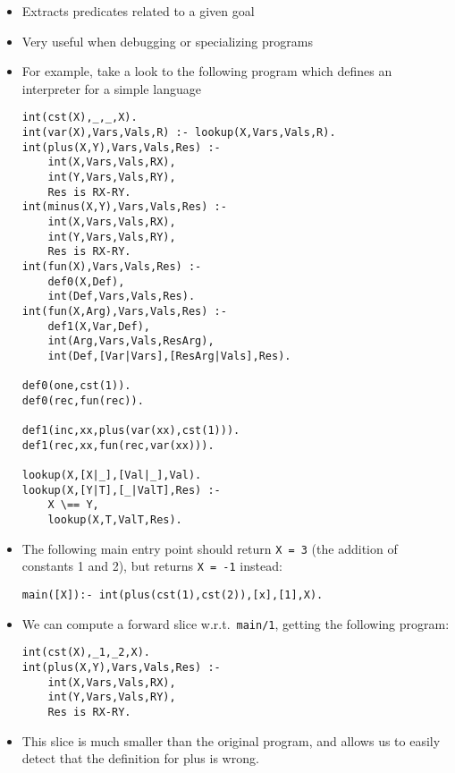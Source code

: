 \documentclass{article}
\renewcommand{\_}{\char'137}
\begin{document}
\begin{itemize}
\item Extracts predicates related to a given goal
\item Very useful when debugging or specializing programs
\item For example, take a look to the following program which defines
  an interpreter for a simple language

\begin{verbatim}
int(cst(X),_,_,X).
int(var(X),Vars,Vals,R) :- lookup(X,Vars,Vals,R).
int(plus(X,Y),Vars,Vals,Res) :- 
    int(X,Vars,Vals,RX), 
    int(Y,Vars,Vals,RY), 
    Res is RX-RY.
int(minus(X,Y),Vars,Vals,Res) :- 
    int(X,Vars,Vals,RX), 
    int(Y,Vars,Vals,RY), 
    Res is RX-RY.
int(fun(X),Vars,Vals,Res) :- 
    def0(X,Def), 
    int(Def,Vars,Vals,Res).
int(fun(X,Arg),Vars,Vals,Res) :- 
    def1(X,Var,Def), 
    int(Arg,Vars,Vals,ResArg),
    int(Def,[Var|Vars],[ResArg|Vals],Res).

def0(one,cst(1)).
def0(rec,fun(rec)).

def1(inc,xx,plus(var(xx),cst(1))).
def1(rec,xx,fun(rec,var(xx))).

lookup(X,[X|_],[Val|_],Val).
lookup(X,[Y|T],[_|ValT],Res) :-
    X \== Y, 
    lookup(X,T,ValT,Res).
\end{verbatim}
  
\item The following main entry point should return \verb+X = 3+ (the
  addition of constants 1 and 2), but returns \verb+X = -1+ instead:

\begin{verbatim}
main([X]):- int(plus(cst(1),cst(2)),[x],[1],X).
\end{verbatim}

\item We can compute a forward slice w.r.t.\ \verb+main/1+, getting the
  following program:

\begin{verbatim}
int(cst(X),_1,_2,X).
int(plus(X,Y),Vars,Vals,Res) :- 
    int(X,Vars,Vals,RX),
    int(Y,Vars,Vals,RY), 
    Res is RX-RY.
\end{verbatim}

\item This slice is much smaller than the original program, and allows
  us to easily detect that the definition for plus is wrong. 

\end{itemize}

\end{document}
